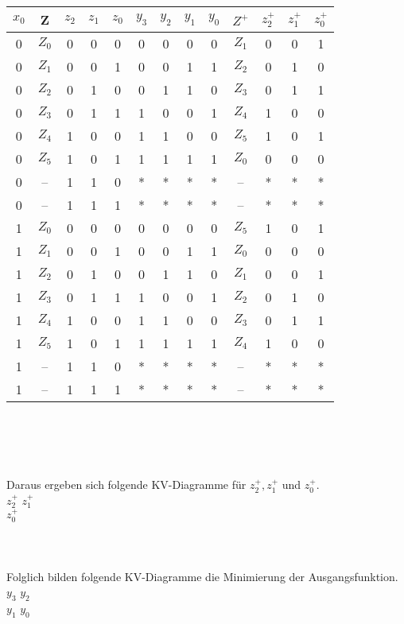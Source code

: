 \documentclass[11pt,a4paper]{article}
\begin{document}
\begin{tabular}{c | c | c | c | c | | c | c | c | c | | c | c | c | c}
$x_0$&Z&$z_2$&$z_1$&$z_0$&$y_3$&$y_2$&$y_1$&$y_0$&$Z^+$&$z^+_2$&$z^+_1$&$z^+_0$ \\ \hline
0&$Z_0$&0&0&0&0&0&0&0&$Z_1$&0&0&1\\
0&$Z_1$&0&0&1&0&0&1&1&$Z_2$&0&1&0\\
0&$Z_2$&0&1&0&0&1&1&0&$Z_3$&0&1&1\\
0&$Z_3$&0&1&1&1&0&0&1&$Z_4$&1&0&0\\
0&$Z_4$&1&0&0&1&1&0&0&$Z_5$&1&0&1\\
0&$Z_5$&1&0&1&1&1&1&1&$Z_0$&0&0&0\\
0&--&1&1&0&*&*&*&*&--&*&*&*\\
0&--&1&1&1&*&*&*&*&--&*&*&*\\ \hline
1&$Z_0$&0&0&0&0&0&0&0&$Z_5$&1&0&1\\
1&$Z_1$&0&0&1&0&0&1&1&$Z_0$&0&0&0\\
1&$Z_2$&0&1&0&0&1&1&0&$Z_1$&0&0&1\\
1&$Z_3$&0&1&1&1&0&0&1&$Z_2$&0&1&0\\
1&$Z_4$&1&0&0&1&1&0&0&$Z_3$&0&1&1\\
1&$Z_5$&1&0&1&1&1&1&1&$Z_4$&1&0&0\\
1&--&1&1&0&*&*&*&*&--&*&*&*\\
1&--&1&1&1&*&*&*&*&--&*&*&*\\
\end{tabular}\\
\\ \\  \\
Daraus ergeben sich folgende KV-Diagramme für $z^+_2,z^+_1$ und $z^+_0$.\\
$z^+_2$
$z^+_1$
\\
$z^+_0$
\\ \\ \\ \\
Folglich bilden folgende KV-Diagramme die Minimierung der Ausgangsfunktion.\\
$y_3$
$y_2$
\\
$y_1$
$y_0$
\\ \\ \\
\end{document}
